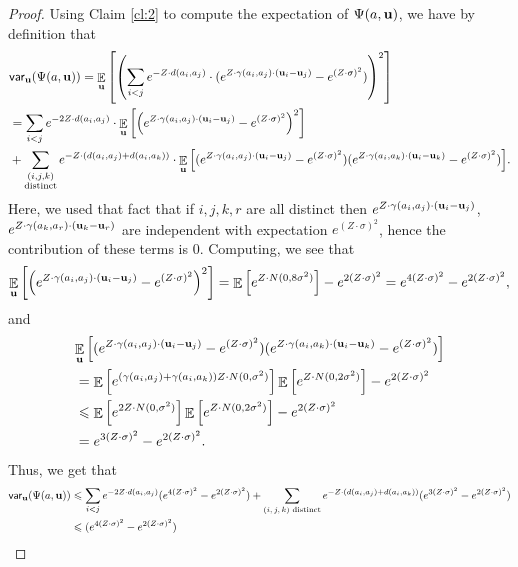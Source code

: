 \documentclass[10pt,a4paper]{article}
\newcommand\E{\mathop{\mathbb{E}}}
\newcommand\Expect[2]{{\mathop{\mathbb{E}}_{#1}\left[ {#2} \right]}}
\renewcommand\leq{\leqslant}
\newcommand{\si}{\sigma}
\begin{document}
\begin{proof}
Using Claim \ref{cl:2} to compute the expectation of $\Psi(a,{\bf u})$, we have by definition that
\begin{align*}
&{\sf var}_{\bf u}  ( \Psi(a,{\bf u} ))
= \E_{\bf u}  \left[\left(\sum_{i<j} e^{-Z\cdot d(a_i,a_j)}\cdot (e^{Z\cdot\gamma(a_i,a_j)\cdot({\bf u} _i-{\bf u} _j)}-e^{(Z\cdot \si)^2}) \right)^2\right]\\
& =\sum_{i<j} e^{-2Z\cdot d(a_i,a_j)} \cdot\Expect{{\bf u}}{\left(e^{Z\cdot\gamma(a_i,a_j)\cdot({\bf u}_i-{\bf u}_j)}-e^{(Z\cdot \si)^2}\right)^2}\\
& + \sum_{\substack{(i,j,k) \\ \text{distinct}}}e^{-Z\cdot (d(a_i,a_j)+d(a_i,a_k))}\cdot
\Expect{{\bf u}}{(e^{Z\cdot\gamma(a_i,a_j)\cdot({\bf u}_i-{\bf u}_j)}-e^{(Z\cdot \si)^2})(e^{Z\cdot\gamma(a_i,a_k)\cdot({\bf u}_i-{\bf u}_k)}-e^{(Z\cdot \si)^2})}.
\end{align*}
Here, we used that fact that if $i,j,k,r$ are all distinct then $e^{Z\cdot\gamma(a_i,a_j)\cdot({\bf u}_i-{\bf u}_j)}$, $e^{Z\cdot\gamma(a_k,a_r)\cdot({\bf u}_k-{\bf u}_r)}$
are independent with expectation $e^{(Z\cdot \sigma)^2}$, hence the contribution of these terms is $0$. Computing, we see that
\[
\Expect{{\bf u}}{\left(e^{Z\cdot\gamma(a_i,a_j)\cdot({\bf u}_i-{\bf u}_j)}-e^{(Z\cdot \si)^2}\right)^2}
=\E\left[e^{Z\cdot N(0,8\sigma^2)}\right]-e^{2(Z\cdot \si)^2}
=e^{4(Z\cdot \si)^2}-e^{2(Z\cdot \si)^2},
\]
and
\begin{align*}
&\Expect{{\bf u}}{(e^{Z\cdot\gamma(a_i,a_j)\cdot({\bf u}_i-{\bf u}_j)}-e^{(Z\cdot \si)^2})
 (e^{Z\cdot\gamma(a_i,a_k)\cdot({\bf u}_i-{\bf u}_k)}-e^{(Z\cdot \si)^2})}\\
 &=
 \E\left[e^{(\gamma(a_i,a_j) + \gamma(a_i,a_k))Z\cdot N(0,\sigma^2)}\right]
 \E\left[e^{Z\cdot N(0,2\sigma^2)}\right]
 -e^{2(Z\cdot \si)^2}\\
 &\leq
 \E\left[e^{2Z\cdot N(0,\sigma^2)}\right]
 \E\left[e^{Z\cdot N(0,2\sigma^2)}\right]
 -e^{2(Z\cdot \si)^2}\\
 &= e^{3(Z\cdot \sigma)^2}-e^{2(Z\cdot \si)^2}.
\end{align*}
Thus, we get that
\begin{align*}
  {\sf var}_{\bf u} ( \Psi(a,{\bf u}))
  &\leq
 \sum_{i<j} e^{-2Z\cdot d(a_i,a_j)} (e^{4 (Z\cdot \si)^2}-e^{2 (Z\cdot \si)^2}) +
 \sum_{\text{$(i,j,k)$ distinct}} e^{-Z\cdot (d(a_i,a_j)+d(a_i,a_k))}(e^{3(Z\cdot \sigma)^2}-e^{2(Z\cdot \si)^2}) \\
 & \leq
 (e^{4 (Z\cdot \si)^2}-e^{2 (Z\cdot \si)^2})

\end{align*}
\end{proof}
\end{document}
